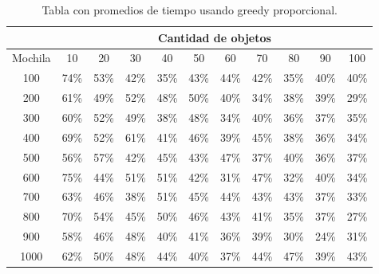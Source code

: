 \documentclass[a4paper]{article}
\begin{document}
\begin{table}[H]
\centering
\relax
\resizebox{\textwidth}{!} {%
\begin{tabular}{|c|c|c|c|c|c|c|c|c|c|c|}
\cline{2-11}
 \multicolumn{1}{c}{} & \multicolumn{10}{|c|}{\textbf{Cantidad de objetos}} \\
\hline
Mochila & 10 & 20 & 30 & 40 & 50 & 60 & 70 & 80 & 90 & 100 \\
\hline
\hline
100 & 74\% & 53\% & 42\% & 35\% & 43\% & 44\% & 42\% & 35\% & 40\% & 40\% \\
\hline
\hline
200 & 61\% & 49\% & 52\% & 48\% & 50\% & 40\% & 34\% & 38\% & 39\% & 29\% \\
\hline
\hline
300 & 60\% & 52\% & 49\% & 38\% & 48\% & 34\% & 40\% & 36\% & 37\% & 35\% \\
\hline
\hline
400 & 69\% & 52\% & 61\% & 41\% & 46\% & 39\% & 45\% & 38\% & 36\% & 34\% \\
\hline
\hline
500 & 56\% & 57\% & 42\% & 45\% & 43\% & 47\% & 37\% & 40\% & 36\% & 37\% \\
\hline
\hline
600 & 75\% & 44\% & 51\% & 51\% & 42\% & 31\% & 47\% & 32\% & 40\% & 34\% \\
\hline
\hline
700 & 63\% & 46\% & 38\% & 51\% & 45\% & 44\% & 43\% & 43\% & 37\% & 33\% \\
\hline
\hline
800 & 70\% & 54\% & 45\% & 50\% & 46\% & 43\% & 41\% & 35\% & 37\% & 27\% \\
\hline
\hline
900 & 58\% & 46\% & 48\% & 40\% & 41\% & 36\% & 39\% & 30\% & 24\% & 31\% \\
\hline
\hline
1000 & 62\% & 50\% & 48\% & 44\% & 40\% & 37\% & 44\% & 47\% & 39\% & 43\% \\
\hline
\end{tabular}%
}
\caption{Tabla con promedios de tiempo usando greedy proporcional.}
\end{table}
\end{document}
